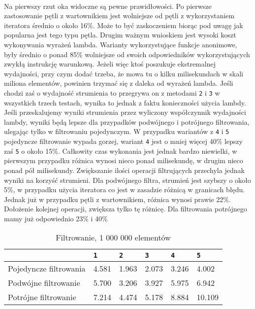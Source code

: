 \documentclass[a4paper,10pt]{report}
\begin{document}
\paragraph{}
Na pierwszy rzut oka widoczne są pewne prawidłowości. Po pierwsze zastosowanie pętli z wartownikiem jest wolniejsze od pętli z wykorzystaniem iteratora średnio o około 16\%. Może to być zaskoczeniem biorąc pod uwagę jak popularna jest tego typu pętla. Drugim ważnym wnioskiem jest wysoki koszt wykonywania wyrażeń lambda. Warianty wykorzystujące funkcje anonimowe, były średnio o ponad 85\% wolniejsze od swoich odpowiedników wykorzystujących zwykłą instrukcję warunkową. Jeżeli więc ktoś poszukuje ekstremalnej wydajności, przy czym dodać trzeba, że mowa tu o kilku milisekundach w skali miliona elementów, powinien trzymać się z daleka od wyrażeń lambda. Jeśli chodzi zaś o wydajność strumienia to przegrywa on z metodami \verb|2| i \verb|3| w wszystkich trzech testach, wynika to jednak z faktu konieczności użycia lambdy. Jeśli przeskalujemy wyniki strumienia przez wyliczony współczynnik wydajności lambdy, wyniki będą lepsze dla przypadków podwójnego i potrójnego filtrowania, ulegając tylko w filtrowaniu pojedynczym. W przypadku wariantów z \verb|4| i \verb|5| pojedyncze filtrowanie wypada gorzej, wariant \verb|4| jest o mniej więcej 40\% lepszy zaś \verb|5| o około 15\%. Całkowity czas wykonania jest jednak bardzo niewielki, w pierwszym przypadku różnica wynosi nieco ponad milisekundę, w drugim nieco ponad pół milisekundy. Zwiększanie ilości operacji filtrujących przechyla jednak wyniki na korzyść strumieni. Dla podwójnego filtra, strumień jest szybszy o około 5\%, w przypadku użycia iteratora co jest w zasadzie różnicą w granicach błędu. Jednak już w przypadku pętli z wartownikiem, różnica wynosi prawie 22\%. Dołożenie kolejnej operacji, zwiększa tylko tę różnicę. Dla filtrowania potrójnego mamy już odpowiednio 23\% i 40\%
\begin{table}[t]
	\caption{Filtrowanie, 1 000 000 elementów}
	\label{tab1}
\begin{tabular}{|l|l|l|l|l|l|}
	\hline 
	& \verb|1| & \verb|2| & \verb|3| & \verb|4| & \verb|5|\\
	\hline
	Pojedyncze filtrowania & 4.581 & 1.963 & 2.073 & 3.246 & 4.002 \\
	\hline
	Podwójne filtrowanie & 5.700 & 3.206 & 3.927 & 5.975 & 6.942 \\
	\hline
	Potrójne filtrowanie & 7.214 & 4.474 & 5.178 & 8.884 & 10.109 \\
	\hline
\end{tabular} 
\end{table}
\end{document}
